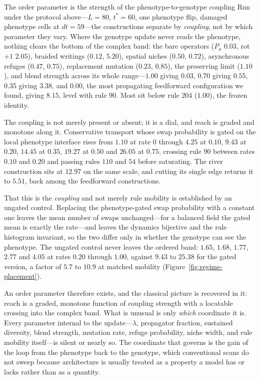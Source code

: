 \begin{empiricalfinding}[label={find:architecture}]{The order parameter is the strength of the phenotype-to-genotype coupling}
Run under the protocol above---$L=80$, $t^{*}=60$, one phenotype flip, damaged
phenotype cells at $dt=59$---the constructions separate by \emph{coupling}, not
by which parameter they vary. Where the genotype update never reads the
phenotype, nothing clears the bottom of the complex band: the bare operators
($P_a$ $0.03$, rot$+1$ $2.05$), braided writings ($0.12$, $5.20$), spatial
niches ($0.50$, $0.72$), asynchronous refuges ($0.47$, $0.75$), replacement
mutation ($0.23$, $0.85$), the preserving limit ($1.10$), and blend strength
across its whole range---$1.00$ giving $0.03$, $0.70$ giving $0.55$, $0.35$
giving $3.38$, and $0.00$, the most propagating feedforward configuration we
found, giving $8.15$, level with rule $90$. Most sit below rule $204$ ($1.00$),
the frozen identity.

The coupling is not merely present or absent; it is a dial, and reach is graded
and monotone along it. Conservative transport whose swap probability is gated on
the local phenotype interface rises from $1.10$ at rate $0$ through $4.25$ at
$0.10$, $9.43$ at $0.20$, $14.45$ at $0.35$, $19.27$ at $0.50$ and $26.05$ at
$0.75$, crossing rule $90$ between rates $0.10$ and $0.20$ and passing rules
$110$ and $54$ before saturating. The river construction sits at $12.97$ on the
same scale, and cutting its single edge returns it to $5.51$, back among the
feedforward constructions.

That this is the \emph{coupling} and not merely rule mobility is established by
an ungated control. Replacing the phenotype-gated swap probability with a
constant one leaves the mean number of swaps unchanged---for a balanced field
the gated mean is exactly the rate---and leaves the dynamics bijective and the
rule histogram invariant, so the two differ only in whether the genotype can see
the phenotype. The ungated control never leaves the ordered band: $1.65$, $1.68$,
$1.77$, $2.77$ and $4.05$ at rates $0.20$ through $1.00$, against $9.43$ to
$25.38$ for the gated version, a factor of $5.7$ to $10.9$ at matched mobility
(Figure~\ref{fig:regime-placement}).

An order parameter therefore exists, and the classical picture is recovered in
it: reach is a graded, monotone function of coupling strength with a locatable
crossing into the complex band. What is unusual is only \emph{which} coordinate
it is. Every parameter internal to the update---$\lambda$, propagator fraction,
sustained diversity, blend strength, mutation rate, refuge probability, niche
width, and rule mobility itself---is silent or nearly so. The coordinate that
governs is the gain of the loop from the phenotype back to the genotype, which
conventional scans do not sweep because architecture is usually treated as a
property a model has or lacks rather than as a quantity.
\end{empiricalfinding}


